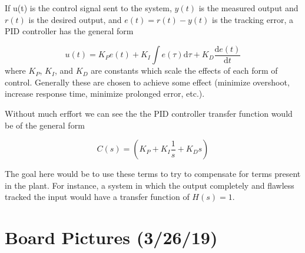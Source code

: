 \documentclass[11pt]{book}
\begin{document}
If u(t) is the control signal sent to the system, $y(t)$ is the measured output and $r(t)$ is the desired output, and $e(t)=r(t)-y(t)$ is the tracking error, a PID controller has the general form

\begin{equation}
	 u(t)=K_{P}e(t)+K_{I}\int e(\tau ){\text{d}}\tau +K_{D}{\frac {{\text{d}}e(t)}{{\text{d}}t}}
\end{equation}
where $K_P$, $K_I$, and $K_D$ are constants which scale the effects of each form of control. Generally these are chosen to achieve some effect (minimize overshoot, increase response time, minimize prolonged error, etc.).

Without much erffort we can see the the PID controller transfer function would be of the general form

\begin{equation}
	C(s)=\left(K_{P}+K_{I}{\frac {1}{s}}+K_{D}s\right)
\end{equation}

The goal here would be to use these terms to try to compensate for terms present in the plant. For instance, a system in which the output completely and flawless tracked the input would have a transfer function of $H(s) = 1$.

\section{Board Pictures (3/26/19)}
\end{document}
